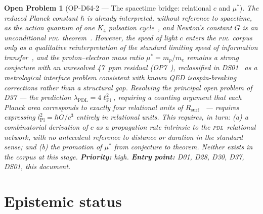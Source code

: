 \documentclass[12pt,a4paper]{article}
\newtheorem{openproblem}{Open Problem}
\newcommand{\Kfour}{K_4}
\newcommand{\hb}{\hbar}
\newcommand{\PDL}{\textsc{pdl}}
\newcommand{\Rsurf}{R_{\mathrm{surf}}}
\newcommand{\lPl}{\ell_{\mathrm{Pl}}}
\begin{document}
\begin{openproblem}[OP-D64-2 --- The spacetime bridge: relational $c$ and $\mu^*$]
\label{op:D64-2}
The reduced Planck constant $\hb$ is already interpreted, without reference to spacetime, as the action quantum of one $\Kfour$ pulsation cycle~\cite{PDL_D01_2026}, and Newton's constant $G$ is an unconditional \PDL\ theorem~\cite{PDL_D21_2026,PDL_D43_2026,PDL_D44_2026}. However, the speed of light $c$ enters the \PDL\ corpus only as a qualitative reinterpretation of the standard limiting speed of information transfer~\cite{PDL_D01_2026}, and the proton--electron mass ratio $\mu^* = m_p/m_e$ remains a strong conjecture with an unresolved 47~ppm residual (OP7~\cite{PDL_D28_2026,PDL_D30_2026}), reclassified in DS01~\cite{PDL_DS01_2026} as a metrological interface problem consistent with known QED isospin-breaking corrections rather than a structural gap. Resolving the principal open problem of D37 --- the prediction $\lambda_{\mathrm{PDL}}=4\lPl^2$, requiring a counting argument that each Planck area corresponds to exactly four relational units of $\Rsurf$~\cite{PDL_D37_2026} --- requires expressing $l_{\mathrm{Pl}}^2 = \hb G/c^3$ entirely in relational units. This requires, in turn: (a) a combinatorial derivation of $c$ as a propagation rate intrinsic to the \PDL\ relational network, with no antecedent reference to distance or duration in the standard sense; and (b) the promotion of $\mu^*$ from conjecture to theorem. Neither exists in the corpus at this stage. \textbf{Priority:} high. \textbf{Entry point:} D01, D28, D30, D37, DS01, this document.
\end{openproblem}

\section{Epistemic status}
\label{sec:epistemic}
\end{document}
